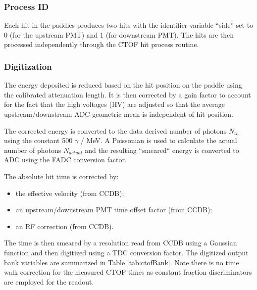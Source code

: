 \subsubsection{Process ID}

Each hit in the paddles produces two hits with the identifier variable ``side'' set to 0 (for the upstream PMT) and 1 (for downstream PMT).
The hits are then processed independently through the CTOF hit process routine.

\subsubsection{Digitization}

The energy deposited is reduced based on the hit position on the paddle using the calibrated attenuation length.
It is then corrected by a gain factor to account for the fact that the high voltages (HV) are adjusted so that
the average upstream/downstream ADC geometric mean is independent of hit position.

The corrected energy is converted to the data derived number of photons $N_{th}$ using the constant 500 $\gamma$ / MeV. A Poissonian is used to
calculate the actual number of photons $N_{actual}$ and the resulting ``smeared`` energy is converted to ADC using the FADC conversion factor.


The absolute hit time is corrected by:

\begin{itemize}
	\item the effective velocity (from CCDB);
	\item an upstream/downstream PMT time offset factor (from CCDB);
	\item an RF correction (from CCDB).
\end{itemize}

The time is then smeared by a resolution read from CCDB using a Gaussian function and then digitized using a TDC conversion factor.
The digitized output bank variables are summarized in Table \ref{tab:ctofBank}.
Note there is no time walk correction for the measured CTOF times as constant fraction discriminators
are employed for the readout.


